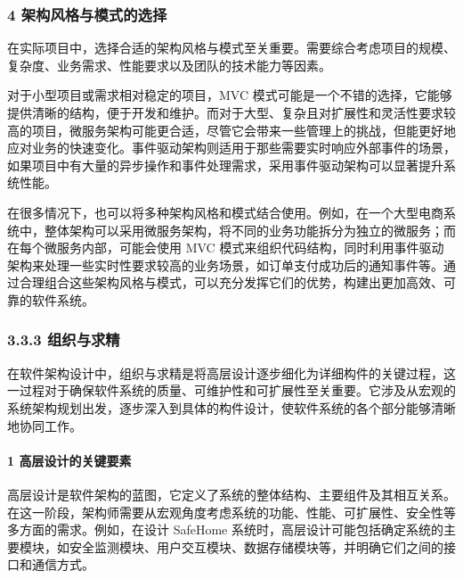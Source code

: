\hypertarget{ux67b6ux6784ux98ceux683cux4e0eux6a21ux5f0fux7684ux9009ux62e9}{%
\subsubsection{4 架构风格与模式的选择}\label{ux67b6ux6784ux98ceux683cux4e0eux6a21ux5f0fux7684ux9009ux62e9}}

在实际项目中，选择合适的架构风格与模式至关重要。需要综合考虑项目的规模、复杂度、业务需求、性能要求以及团队的技术能力等因素。

对于小型项目或需求相对稳定的项目，MVC 模式可能是一个不错的选择，它能够提供清晰的结构，便于开发和维护。而对于大型、复杂且对扩展性和灵活性要求较高的项目，微服务架构可能更合适，尽管它会带来一些管理上的挑战，但能更好地应对业务的快速变化。事件驱动架构则适用于那些需要实时响应外部事件的场景，如果项目中有大量的异步操作和事件处理需求，采用事件驱动架构可以显著提升系统性能。

在很多情况下，也可以将多种架构风格和模式结合使用。例如，在一个大型电商系统中，整体架构可以采用微服务架构，将不同的业务功能拆分为独立的微服务；而在每个微服务内部，可能会使用 MVC 模式来组织代码结构，同时利用事件驱动架构来处理一些实时性要求较高的业务场景，如订单支付成功后的通知事件等。通过合理组合这些架构风格与模式，可以充分发挥它们的优势，构建出更加高效、可靠的软件系统。

\hypertarget{ux7ec4ux7ec7ux4e0eux6c42ux7cbe}{%
\subsubsection{3.3.3 组织与求精}\label{ux7ec4ux7ec7ux4e0eux6c42ux7cbe}}

在软件架构设计中，组织与求精是将高层设计逐步细化为详细构件的关键过程，这一过程对于确保软件系统的质量、可维护性和可扩展性至关重要。它涉及从宏观的系统架构规划出发，逐步深入到具体的构件设计，使软件系统的各个部分能够清晰地协同工作。

\hypertarget{ux9ad8ux5c42ux8bbeux8ba1ux7684ux5173ux952eux8981ux7d20}{%
\paragraph{1 高层设计的关键要素}\label{ux9ad8ux5c42ux8bbeux8ba1ux7684ux5173ux952eux8981ux7d20}}

高层设计是软件架构的蓝图，它定义了系统的整体结构、主要组件及其相互关系。在这一阶段，架构师需要从宏观角度考虑系统的功能、性能、可扩展性、安全性等多方面的需求。例如，在设计 SafeHome 系统时，高层设计可能包括确定系统的主要模块，如安全监测模块、用户交互模块、数据存储模块等，并明确它们之间的接口和通信方式。

